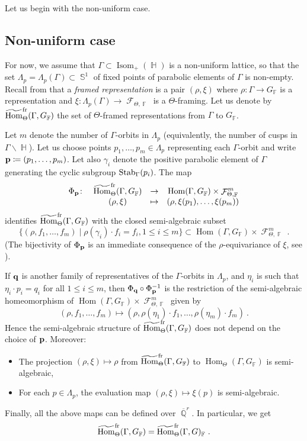 \documentclass{amsart}
\theoremstyle{plain}
\theoremstyle{definition}
\DeclareMathOperator{\Hom}{Hom}
\DeclareMathOperator{\Isom}{Isom}
\DeclareMathOperator{\Fc}{\mathcal{F}}
\DeclareMathOperator{\Fb}{{\mathbb{F}}}
\DeclareMathOperator{\Hb}{\mathbb{H}}
\DeclareMathOperator{\Sb}{\mathbb{S}}
\DeclareMathOperator{\Qb}{\mathbb{Q}}
\newcommand{\fr}{\textnormal{fr}}
\newcommand{\Stab}{\textnormal{Stab}}
\newcommand{\Qbar}{\overline{\Qb}^r}
\newcommand{\1}{\mathbf{1}}
\begin{document}
Let us begin with the non-uniform case.

\subsection{Non-uniform case}
\label{subs: Semialg Framed Repr}
For now, we assume that $\Gamma\subset\Isom_+(\Hb)$ is a non-uniform lattice, so that the set $\Lambda_p=\Lambda_p(\Gamma)\subset\Sb^1$ of fixed points of parabolic elements of $\Gamma$ is non-empty.
Recall from  that a \emph{framed representation} is a pair $(\rho,\xi)$ where $\rho\colon \Gamma \to G_{\Fb}$ is a representation and $\xi\colon \Lambda_p(\Gamma) \to \Fc_{\Theta,\Fb}$ is a $\Theta$-framing.
Let us denote by $\widetilde{\Hom}_\Theta^{\fr}(\Gamma,G_{\Fb})$ the set of $\Theta$-framed representations from $\Gamma$ to $G_{\Fb}$.


Let $m$ denote the number of $\Gamma$-orbits in $\Lambda_p$ (equivalently, the number of cusps in $\Gamma \backslash \Hb$). Let us choose points $p_1,\dots,p_m \in\Lambda_p$ representing each $\Gamma$-orbit and write ${\bf p}\coloneqq (p_1,\dots,p_m)$. Let also $\gamma_i$ denote the positive parabolic element of $\Gamma$ generating the cyclic subgroup $\Stab_\Gamma(p_i)$.
The map
\[\begin{array}{cccc}
\Phi_{\bf p} \colon & \widetilde{\Hom}_\Theta^{\fr}(\Gamma,G_{\Fb}) & \to & \Hom(\Gamma,G_{\Fb}) \times \Fc_{\Theta,\Fb}^m\\
&(\rho, \xi) & \mapsto & (\rho, \xi(p_1),\ldots, \xi(p_m))
\end{array}
\]
identifies $\widetilde{\Hom}_\Theta^{\fr}(\Gamma,G_{\Fb})$ with the closed semi-algebraic subset
\[\{(\rho, f_1, \ldots, f_m) \mid \rho(\gamma_i)\cdot f_i = f_i, 1\leq i \leq m\} \subset \Hom(\Gamma,G_{\Fb}) \times \Fc_{\Theta,\Fb}^m~.\]
(The bijectivity of $\Phi_{\bf p}$ is an immediate consequence of the $\rho$-equivariance of $\xi$, see ).

If $\bf q$ is another family of representatives of the $\Gamma$-orbits in $\Lambda_p$, and $\eta_i$ is such that $\eta_i\cdot p_i = q_i$ for all $1\leq i \leq m$, then $\Phi_{\bf q} \circ \Phi_{\bf p}^{-1}$ is the restriction of the semi-algebraic homeomorphism of $\Hom(\Gamma,G_{\Fb}) \times \Fc_{\Theta,\Fb}^m$ given by
\[(\rho, f_1,\ldots, f_m) \mapsto (\rho, \rho(\eta_1)\cdot f_1, \ldots, \rho(\eta_m)\cdot f_m)~.\]
Hence the semi-algebraic structure of $\widetilde{\Hom}_\Theta^{\fr}(\Gamma,G_{\Fb})$ does not depend on the choice of $\bf p$. Moreover:
\begin{itemize}
    \item The projection $(\rho,\xi) \mapsto \rho$ from $\widetilde{\Hom}_\Theta^{\fr}(\Gamma,G_{\Fb})$ to $\Hom_\Theta(\Gamma,G_{\Fb})$ is semi-algebraic,
    \item For each $p\in \Lambda_p$, the evaluation map
    $(\rho,\xi)\mapsto \xi(p)$ is semi-algebraic.
\end{itemize}
Finally, all the above maps can be defined over $\Qbar$. In particular, we get
\[\widetilde{\Hom}_\Theta^{\fr}(\Gamma, G_{\Fb}) = \widetilde{\Hom}_\Theta^{\fr}(\Gamma,G)_{\Fb}~.\]
\end{document}
